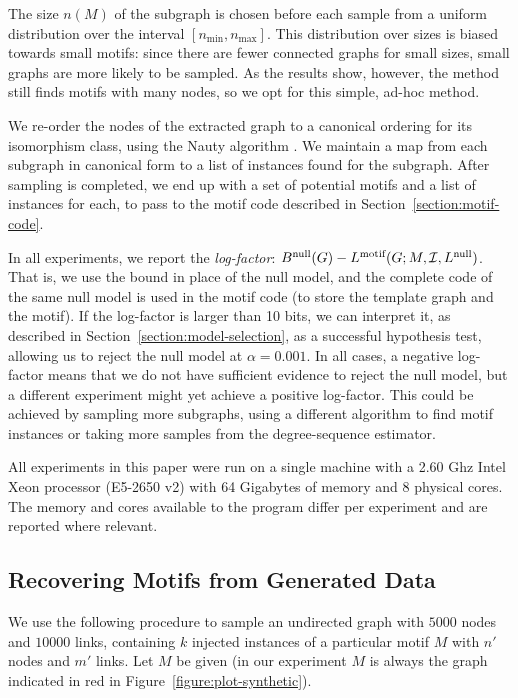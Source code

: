 \documentclass[twoside,11pt]{article}
\begin{document}
The size $n(M)$ of the subgraph is chosen before each sample from a uniform distribution over the interval $[n_\text{min}, n_\text{max}]$. This distribution over sizes is biased towards small motifs: since there are fewer connected graphs for small sizes, small graphs are more likely to be sampled. As the results show, however, the method still finds motifs with many nodes, so we opt for this simple, ad-hoc method.

We re-order the nodes of the extracted graph to a canonical ordering for its isomorphism class, using the Nauty algorithm \citep{mckay1981practical}. We maintain a map from each  subgraph in canonical form to a list of instances found for the subgraph. After sampling is completed, we end up with a set of potential motifs and a list of instances for each, to pass to the motif code described in Section~\ref{section:motif-code}.

In all experiments, we report the \emph{log-factor}: $B^\text{null}(G) - L^\text{motif}(G; M, {\cal I}, L^\text{null})$. That is, we use the bound in place of the null model, and the complete code of the same null model is used in the motif code (to store the template graph and the motif). If the log-factor is larger than 10 bits, we can interpret it, as described in Section~\ref{section:model-selection}, as a successful hypothesis test, allowing us to reject the null model at $\alpha=0.001$. In all cases, a negative log-factor means that we do not have sufficient evidence to reject the null model, but a different experiment might yet achieve a positive log-factor. This could be achieved by sampling more subgraphs, using a different algorithm to find motif instances or taking more samples from the degree-sequence estimator.

All experiments in this paper were run on a single machine with a 2.60 Ghz Intel Xeon processor (E5-2650 v2) with 64 Gigabytes of memory and 8 physical cores. The memory and cores available to the program differ per experiment and are reported where relevant. 

\subsection{Recovering Motifs from Generated Data}

\label{section:recovering}

We use the following procedure to sample an undirected graph with $5000$ nodes and $10000$ links, containing $k$ injected instances of a particular motif $M$ with $n'$ nodes and $m'$ links. Let $M$ be given (in our experiment $M$ is always the graph indicated in red in Figure~\ref{figure:plot-synthetic}).
\end{document}

